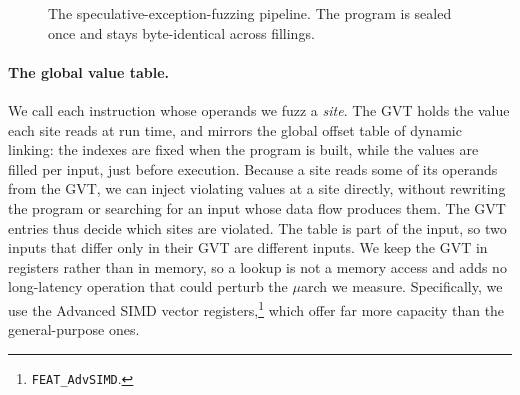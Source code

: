 \documentclass[letterpaper,twocolumn,10pt]{article}
\makeatletter
\theoremstyle{definition}
\def\uarch@bold#1#2\@nil{\if b#1\boldmath\fi}
\DeclareRobustCommand{\uarch}{{\expandafter\uarch@bold\f@series\@nil\ensuremath{\mu}}arch\xspace}
\makeatother
\begin{document}
\begin{figure}[t]
\centering
{}
\caption{The speculative-exception-fuzzing pipeline. The program is sealed once and stays
byte-identical across fillings.}
\label{fig:flow}
\end{figure}

\paragraph{The global value table.}
We call each instruction whose operands we fuzz a \emph{site}. The GVT holds the value each site
reads at run time, and mirrors the global offset table of dynamic linking: the indexes are fixed
when the program is built, while the values are filled per input, just before execution. Because a
site reads some of its operands from the GVT, we can inject violating values at a site directly,
without rewriting the program or searching for an input whose data flow produces them. The GVT
entries thus decide which sites are violated. The table is part of the input, so two inputs that
differ only in their GVT are different inputs. We keep the GVT in registers rather than in memory,
so a lookup is not a memory access and adds no long-latency operation that could perturb the
\uarch we measure. Specifically, we use the Advanced SIMD vector registers,\footnote{\texttt{FEAT\_AdvSIMD}.}
which offer far more capacity than the general-purpose ones.
\end{document}
